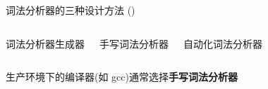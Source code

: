 
\begin{frame}{}
  \begin{center}
    {\large 词法分析器的三种设计方法 ()}
  \end{center}

  \vspace{0.30cm}
  \begin{columns}
      \begin{center}
        词法分析器生成器
      \end{center}
      \begin{center}
        手写词法分析器
      \end{center}
      \begin{center}
        自动化词法分析器
      \end{center}
  \end{columns}

  \vspace{0.80cm}
  \begin{center}
    生产环境下的编译器(如 gcc)通常选择{\bf 手写词法分析器}
  \end{center}
\end{frame}

\begin{frame}{}

  \begin{columns}
  \end{columns}
\end{frame}
